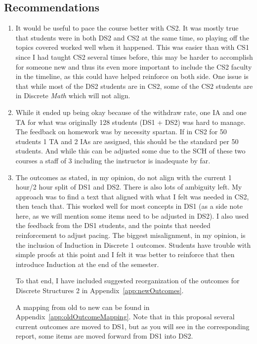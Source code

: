 \documentclass[11pt]{article}
\begin{document}
\subsection{Recommendations}
\begin{enumerate}
\item It would be useful to pace the course better with CS2. 
It was mostly true that students were in both DS2 and CS2 at the same time, so playing off the topics covered worked well when it happened. 
This was easier than with CS1 since I had taught CS2 several times before, this may be harder to accomplish for someone new and thus its even more important to include the CS2 faculty in the timeline, 
as this could have helped reinforce on both side. 
One issue is that while most of the DS2 students are in CS2, some of the CS2 students are in Discrete \textit{Math} which will not align. 

\item While it ended up being okay because of the withdraw rate, 
one IA and one TA for what was originally 128 students (DS1 + DS2) was hard to manage. 
The feedback on homework was by necessity spartan.
If in CS2 for 50 students 1 TA and 2 IAs are assigned, this should be the standard per 50 students. 
And while this can be adjusted some due to the SCH of these two courses a staff of 3 including the instructor is inadequate by far. 

\item The outcomes as stated, in my opinion, do not align with the current 1 hour/2 hour split of DS1 and DS2. 
There is also lots of ambiguity left.
My approach was to find a text that aligned with what I felt was needed in CS2, then teach that. 
This worked well for most concepts in DS1 (as a side note here, as we will mention some items need to be adjusted in DS2). 
I also used the feedback from the DS1 students, and the points that needed reinforcement to adjust pacing. 
The biggest misalignment, in my opinion, is the inclusion of Induction in Discrete 1 outcomes. 
Students have trouble with simple proofs at this point and I felt it was better to reinforce that then introduce Induction at the end of the semester. 

To that end, I have included suggested reorganization of the outcomes for Discrete Structures 2 in Appendix~\ref{app:newOutcomes}. 

A mapping from old to new can be found in Appendix~\ref{app:oldOutcomeMapping}. 
Note that in this proposal several current outcomes are moved to DS1, but as you will see in the corresponding report,  
some items are moved forward from DS1 into DS2. 
\end{enumerate}
\end{document}
